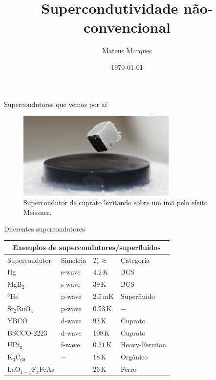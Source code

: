\documentclass[aspectratio=169,xcolor={table,dvipsnames,usenames}]{beamer}
\title[Supercondutividade não-convencional]{\LARGE{Supercondutividade não-convencional}}
\author[Mateus Marques]{
\large{Mateus Marques
}}
\date{\today}
\begin{document}
\begin{frame}
  \titlepage
\end{frame}

\begin{frame}{Supercondutores que vemos por aí}

\begin{figure}[H]
\centering
\includegraphics[width=0.7\textwidth]{fig/levitating.jpg}
\caption{Supercondutor de cuprato levitando sobre um ímã pelo efeito Meissner.}
\label{fig:levitating}
\end{figure}

\end{frame}

\begin{frame}{Diferentes supercondutores}


\begin{tabular}{ |p{3cm}||p{3cm}|p{3cm}|p{3cm}|  }
\hline
\multicolumn{4}{|c|}{Exemplos de supercondutores/superfluidos} \\
\hline
Supercondutor & Simetria & $T_c \approx$ & Categoria \\
\hline
Hg                   & s-wave   & $4.2   \, \text{K}$      & BCS \\
MgB$_2$              & s-wave   & $39    \, \text{K}$      & BCS \\
$^3$He               & p-wave   & $2.5   \, \text{mK}$     & Superfluido \\
Sr$_2$RuO$_4$        & p-wave   & $0.93  \, \text{K}$      & $-$ \\
YBCO                 & d-wave   & $93  \, \text{K}$        & Cuprato \\
BSCCO-2223           & d-wave   & $108   \, \text{K}$      & Cuprato \\
UPt$_3$              & f-wave   & $0.51  \, \text{K}$      & Heavy-Fermion \\
K$_3$C$_{60}$        & $-$      & $18    \, \text{K}$      & Orgânico  \\
LaO$_{1-x}$F$_x$FeAs & $-$      & $26    \, \text{K}$      & Ferro  \\
\hline
\end{tabular}

\end{frame}
\end{document}

